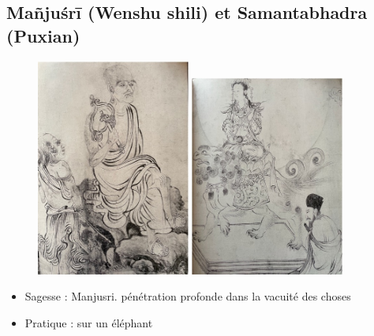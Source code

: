 \subsection{Mañjuśrī (Wenshu shili) et Samantabhadra (Puxian)}



\begin{figure}
    \centering
    \includegraphics[width=0.45\textwidth]{ConfucianismeTaoismeBouddhismeChinois/Images/Arhat.jpg}
    \includegraphics[width=0.45\textwidth]{ConfucianismeTaoismeBouddhismeChinois/Images/Bodhisattva.jpg}
  
    \label{fig:enter-label}
\end{figure}

\begin{itemize}
    \item Sagesse : Manjusri. pénétration profonde dans la vacuité des choses
    \item Pratique : sur un éléphant
\end{itemize}
 




